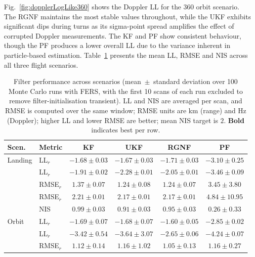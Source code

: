 \documentclass[conference]{IEEEtran}
\begin{document}
Fig.~\ref{fig:dopplerLogLike360} shows the Doppler LL for the 360\textdegree{} orbit scenario. The RGNF maintains the most stable values throughout, while the UKF exhibits significant dips during turns as its sigma-point spread amplifies the effect of corrupted Doppler measurements. The KF and PF show consistent behaviour, though the PF produces a lower overall LL due to the variance inherent in particle-based estimation. Table~\ref{tab:filter_perf} presents the mean LL, RMSE and NIS across all three flight scenarios.

\begin{table}[t]
\centering
\caption{Filter performance across scenarios (mean~$\pm$~standard deviation over 100 Monte Carlo runs with FERS, with the first 10 scans of each run excluded to remove filter-initialisation transient). LL and NIS are averaged per scan, and RMSE is computed over the same window; RMSE units are km (range) and Hz (Doppler); higher LL and lower RMSE are better; mean NIS target is $2$. \textbf{Bold} indicates best per row.}
\label{tab:filter_perf}
\setlength{\tabcolsep}{2pt}
\scriptsize
\begin{tabular*}{\columnwidth}{@{\extracolsep{\fill}}llcccc@{}}
\toprule
\textbf{Scen.} & \textbf{Metric} & \textbf{KF} & \textbf{UKF} & \textbf{RGNF} & \textbf{PF} \\
\midrule
Landing & LL$_r$        & $-1.68{\pm}0.03$ & $\mathbf{-1.67{\pm}0.03}$ & $-1.71{\pm}0.03$ & $-3.10{\pm}0.25$ \\
        & LL$_{\dot r}$ & $\mathbf{-1.91{\pm}0.02}$ & $-2.28{\pm}0.01$ & $-2.05{\pm}0.01$ & $-3.46{\pm}0.09$ \\
        & RMSE$_r$      & $1.37{\pm}0.07$ & $\mathbf{1.24{\pm}0.08}$ & $\mathbf{1.24{\pm}0.07}$ & $3.45{\pm}3.80$ \\
        & RMSE$_{\dot r}$ & $2.21{\pm}0.01$ & $\mathbf{2.17{\pm}0.01}$ & $\mathbf{2.17{\pm}0.01}$ & $4.84{\pm}10.95$ \\
        & NIS           & $\mathbf{0.99{\pm}0.03}$ & $0.91{\pm}0.03$ & $0.95{\pm}0.03$ & $0.26{\pm}0.33$ \\
\addlinespace
360\textdegree{} Orbit & LL$_r$        & $-1.69{\pm}0.07$ & $-1.68{\pm}0.07$ & $\mathbf{-1.60{\pm}0.05}$ & $-2.85{\pm}0.02$ \\
      & LL$_{\dot r}$ & $-3.42{\pm}0.54$ & $-3.64{\pm}3.07$ & $\mathbf{-2.65{\pm}0.06}$ & $-4.24{\pm}0.07$ \\
      & RMSE$_r$      & $1.12{\pm}0.14$ & $1.16{\pm}1.02$ & $\mathbf{1.05{\pm}0.13}$ & $1.16{\pm}0.27$ \\

\end{tabular*}
\end{table}
\end{document}
